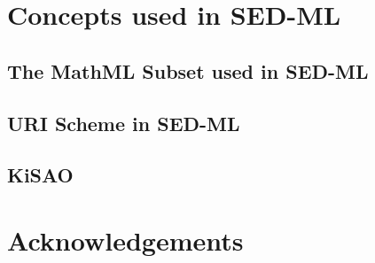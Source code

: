 \documentclass[11pt]{article}
\begin{document}

\tableofcontents
\newpage


  

  
  \section{Concepts used in SED-ML}

  \subsection{The MathML Subset used in SED-ML}
  

  \subsection{URI Scheme in SED-ML}  
  
  
  \subsection{KiSAO}
  

  

  

  

  

\section*{Acknowledgements}

\end{document}
